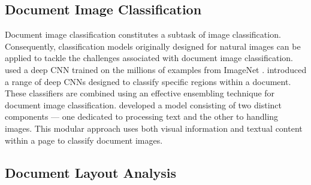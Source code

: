 

\subsection{Document Image Classification} 

Document image classification constitutes a subtask of image classification. Consequently, classification models originally designed for natural images can be applied to tackle the challenges associated with document image classification. \citet{afzal2015deepdocclassifier} used a deep \ac{CNN} trained on the millions of examples from ImageNet \citep{deng2009imagenet}. \citet{das2018document} introduced a range of deep \acp{CNN} designed to classify specific regions within a document. These classifiers are combined using an effective ensembling technique for document image classification. \citet{dauphinee2019modular}  developed a model consisting of two distinct components — one dedicated to processing text and the other to handling images. This modular approach uses both visual information and textual content within a page to classify document images.

\subsection{Document Layout Analysis} 
\label{subsection:related-document-understanding-dla}

